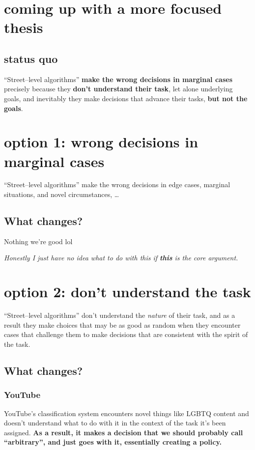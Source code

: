 \documentclass[main]{subfiles}
\begin{document}
\section*{coming up with a more focused thesis}
\subsection*{status quo}
``Street–level algorithms''
\textbf{make the wrong decisions in marginal cases} precisely because
they \textbf{don’t understand their task}, let alone underlying goals, and inevitably
they make decisions that advance their tasks, \textbf{but not the goals}.

\section{option 1: wrong decisions in marginal cases}
``Street--level algorithms'' make the wrong decisions in edge cases, marginal situations, and novel circumstances, \dots {}

\subsection{What changes?}
Nothing we're good lol

\noindent\textit{Honestly I just have no idea what to do with this if \textbf{this} is the core argument.}

\section{option 2: don't understand the task}

``Street--level algorithms'' don't understand the \textit{nature} of their task, and as a result they make choices that may be as good as random when they encounter cases that challenge them to make decisions that are consistent with the spirit of the task.

\subsection{What changes?}

\subsubsection{YouTube}
YouTube's classification system encounters novel things
like LGBTQ content
and doesn't understand what to do with it in the context of the task it's been assigned.
\textbf{As a result, it makes a decision that we should probably call ``arbitrary'', and just goes with it, essentially creating a policy.}
\end{document}
